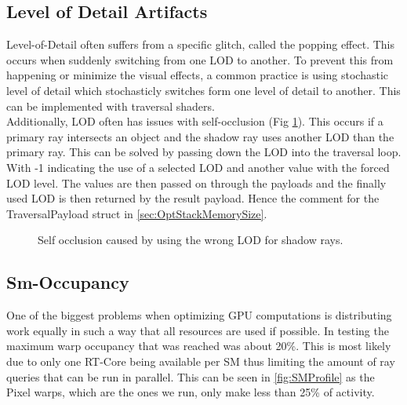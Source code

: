 \subsection{Level of Detail Artifacts}
\label{sec:LODArtifacts}
Level-of-Detail often suffers from a specific glitch, called the popping effect. This occurs when suddenly switching from one LOD to another. To prevent this from happening or minimize the visual effects, a common practice is using stochastic level of detail which stochasticly switches form one level of detail to another. This can be implemented with traversal shaders.\\
Additionally, LOD often has issues with self-occlusion (Fig \ref{fig:LODOcclusion}). This occurs if a primary ray intersects an object and the shadow ray uses another LOD than the primary ray. This can be solved by passing down the LOD into the traversal loop. With -1 indicating the use of a selected LOD and another value with the forced LOD level. The values are then passed on through the payloads and the finally used LOD is then returned by the result payload. Hence the comment for the TraversalPayload struct in \ref{sec:OptStackMemorySize}.
\begin{figure}[h]
    \hfill
    \hfill
    \hfill
    \caption{Self occlusion caused by using the wrong LOD for shadow rays.}
    \label{fig:LODOcclusion}
\end{figure}
\subsection{Sm-Occupancy}
\label{sec:SmOccupancy}
One of the biggest problems when optimizing GPU computations is distributing work equally in such a way that all resources are used if possible. In testing the maximum warp occupancy that was reached was about 20\%. This is most likely due to only one RT-Core being available per SM thus limiting the amount of ray queries that can be run in parallel. This can be seen in \ref{fig:SMProfile} as the Pixel warps, which are the ones we run, only make less than 25\% of activity.
\newpage
